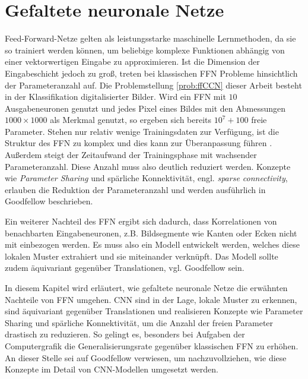 \chapter{Gefaltete neuronale Netze}
\label{kap:CNN}

Feed-Forward-Netze gelten als leistungsstarke maschinelle Lernmethoden, da sie so trainiert werden können, um beliebige komplexe Funktionen abhängig von einer vektorwertigen Eingabe zu approximieren. Ist die Dimension der Eingabeschicht jedoch zu groß, treten bei klassischen FFN Probleme hinsichtlich der Parameteranzahl auf. Die Problemstellung \ref{prob:ffCCN} dieser Arbeit besteht in der Klassifikation digitalisierter Bilder. Wird ein FFN mit $10$ Ausgabeneuronen genutzt und jedes Pixel eines Bildes mit den Abmessungen $1000 \times 1000$ als Merkmal genutzt, so ergeben sich bereits $10^7+100$ freie Parameter. Stehen nur relativ wenige Trainingsdaten zur Verfügung, ist die Struktur des FFN zu komplex und dies kann zur Überanpassung führen \cite{caruana2000overfitting,bilbao2017overfitting}. Außerdem steigt der Zeitaufwand der Trainingsphase mit wachsender Parameteranzahl. Diese Anzahl muss also deutlich reduziert werden. 
Konzepte wie \textit{Parameter Sharing} und spärliche Konnektivität, engl. \textit{sparse connectivity}, erlauben die Reduktion der Parameteranzahl und werden ausführlich in Goodfellow \cite{Goodfellow-et-al-2016} beschrieben.

Ein weiterer Nachteil des FFN ergibt sich dadurch, dass Korrelationen von benachbarten Eingabeneuronen, z.B. Bildsegmente wie Kanten oder Ecken nicht mit einbezogen werden. Es muss also ein Modell entwickelt werden, welches diese lokalen Muster extrahiert und sie miteinander verknüpft. Das Modell sollte zudem äquivariant gegenüber Translationen, vgl. Goodfellow \cite{Goodfellow-et-al-2016} sein.

In diesem Kapitel wird erläutert, wie gefaltete neuronale Netze die erwähnten Nachteile von FFN umgehen. CNN sind in der Lage, lokale Muster zu erkennen, sind äquivariant gegenüber Translationen und realisieren Konzepte wie Parameter Sharing und spärliche Konnektivität, um die Anzahl der freien Parameter drastisch zu reduzieren. So gelingt es, besonders bei Aufgaben der Computergrafik \cite{DBLP:conf/nips/KrizhevskySH12, DBLP:journals/pieee/LeCunBBH98,DBLP:conf/cvpr/CiresanMS12} die Generalisierungsrate gegenüber klassischen FFN zu erhöhen. An dieser Stelle sei auf Goodfellow \cite{Goodfellow-et-al-2016} verwiesen, um nachzuvollziehen, wie diese Konzepte im Detail von CNN-Modellen umgesetzt werden.


